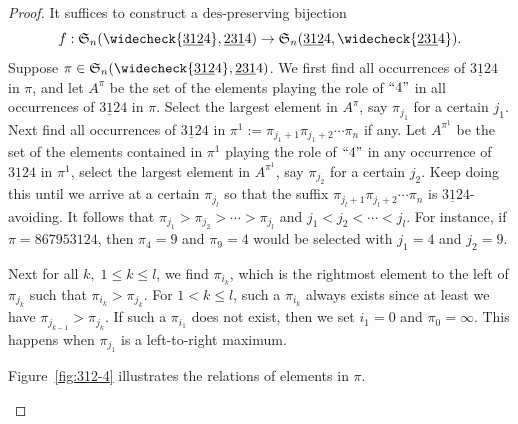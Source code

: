 \documentclass[11pt,reqno]{amsart}
\numberwithin{equation}{section}
\theoremstyle{plain}
\theoremstyle{definition}
\renewcommand{\S}{\mathfrak{S}}
\def\des{\mathrm{des}}
\begin{document}
\begin{proof}
  It suffices to construct a $\des$-preserving bijection 
  $$f: \S_n(\widecheck{\underline{312}4},\underline{231}4) \to \S_n(\underline{312}4,\widecheck{\underline{231}4}).$$
  Suppose $\pi\in \S_n(\widecheck{\underline{312}4},\underline{231}4)$. 
  We first find all occurrences of $\underline{312}4$ in $\pi$, and
  let $A^{\pi}$ be the set of the elements playing the role of $``4"$ in all occurrences of $\underline{312}4$ in $\pi$. Select the largest element in $A^{\pi}$, say $\pi_{j_1}$ for a certain $j_1$.
  Next find all occurrences of $\underline{312}4$ in $\pi^1:=\pi_{j_1+1} \pi_{j_1+2}\cdots \pi_n$ if any. Let $A^{\pi^1}$ be the set of the elements contained in $\pi^1$ playing the role of $``4"$ in any occurrence of $\underline{312}4$ in $\pi^1$, select the largest element in $A^{\pi^1}$, say $\pi_{j_2}$ for a certain $j_2$. Keep doing this until we arrive at a certain $\pi_{j_l}$ so that the suffix $\pi_{j_l+1}\pi_{j_l+2}\cdots \pi_{n}$ is $\underline{312}4$-avoiding. It follows that $\pi_{j_1}>\pi_{j_2}>\cdots>\pi_{j_l}$ and $j_1<j_2<\cdots<j_l$.
  For instance, if $\pi=867953124$, then $\pi_4=9$ and $\pi_9=4$ would be selected with $j_1=4$ and $j_2=9$.

  Next for all $k,\; 1\le k\le l$, we find $\pi_{i_k}$, which is the rightmost element to the left of $\pi_{j_k}$ such that $\pi_{i_k}>\pi_{j_k}$. For $1<k\le l$, such a $\pi_{i_k}$ always exists since at least we have $\pi_{j_{k-1}}>\pi_{j_k}$. If such a $\pi_{i_1}$ does not exist, then we set $i_1=0$ and $\pi_0=\infty$. This happens when $\pi_{j_1}$ is a left-to-right maximum. 
  
  Figure~\ref{fig:312-4} illustrates the relations of elements in $\pi$. 
  \begin{figure}[ht]
    \centering
\end{figure}
\end{proof}
\end{document}
